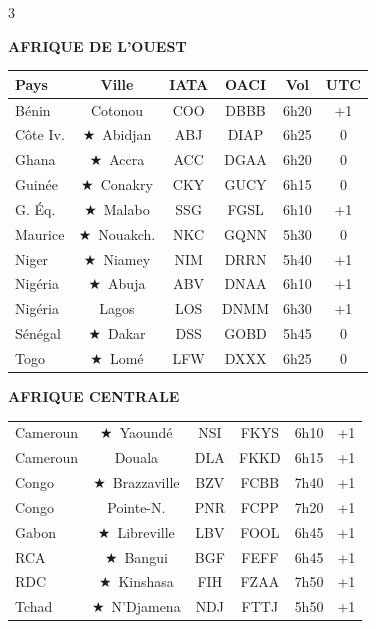 \documentclass[9pt,a4paper,landscape]{article}
\newcommand{\CAP}{\textcolor{capgold}{$\bigstar$}}
\begin{document}
\begin{multicols}{3}
\scriptsize

\textbf{\color{afrgreen}AFRIQUE DE L'OUEST}\\[-0.1cm]
\begin{tabular}{@{}l c c c c c@{}}
\toprule
\textbf{Pays} & \textbf{Ville} & \textbf{IATA} & \textbf{OACI} & \textbf{Vol} & \textbf{UTC} \\
\midrule
\rowcolor{afrlight} Bénin & Cotonou & COO & DBBB & 6h20 & +1 \\
Côte Iv. & \CAP\ Abidjan & ABJ & DIAP & 6h25 & 0 \\
\rowcolor{afrlight} Ghana & \CAP\ Accra & ACC & DGAA & 6h20 & 0 \\
Guinée & \CAP\ Conakry & CKY & GUCY & 6h15 & 0 \\
\rowcolor{afrlight} G. Éq. & \CAP\ Malabo & SSG & FGSL & 6h10 & +1 \\
Maurice & \CAP\ Nouakch. & NKC & GQNN & 5h30 & 0 \\
\rowcolor{afrlight} Niger & \CAP\ Niamey & NIM & DRRN & 5h40 & +1 \\
Nigéria & \CAP\ Abuja & ABV & DNAA & 6h10 & +1 \\
\rowcolor{afrlight} Nigéria & Lagos & LOS & DNMM & 6h30 & +1 \\
Sénégal & \CAP\ Dakar & DSS & GOBD & 5h45 & 0 \\
\rowcolor{afrlight} Togo & \CAP\ Lomé & LFW & DXXX & 6h25 & 0 \\
\bottomrule
\end{tabular}

\vspace{0.15cm}
\textbf{\color{afrgreen}AFRIQUE CENTRALE}\\[-0.1cm]
\begin{tabular}{@{}l c c c c c@{}}
\toprule
\rowcolor{afrlight} Cameroun & \CAP\ Yaoundé & NSI & FKYS & 6h10 & +1 \\
Cameroun & Douala & DLA & FKKD & 6h15 & +1 \\
\rowcolor{afrlight} Congo & \CAP\ Brazzaville & BZV & FCBB & 7h40 & +1 \\
Congo & Pointe-N. & PNR & FCPP & 7h20 & +1 \\
\rowcolor{afrlight} Gabon & \CAP\ Libreville & LBV & FOOL & 6h45 & +1 \\
RCA & \CAP\ Bangui & BGF & FEFF & 6h45 & +1 \\
\rowcolor{afrlight} RDC & \CAP\ Kinshasa & FIH & FZAA & 7h50 & +1 \\
Tchad & \CAP\ N'Djamena & NDJ & FTTJ & 5h50 & +1 \\
\bottomrule
\end{tabular}


\end{multicols}
\end{document}

